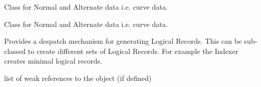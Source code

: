 \documentclass[letterpaper,10pt,english]{sphinxmanual}
\begin{document}

\begin{fulllineitems}
\label{\detokenize{ref/LIS/core/LogiRec:TotalDepth.LIS.core.LogiRec.LrNormalAlternateData}}
Class for Normal and Alternate data i.e. curve data.

\end{fulllineitems}


\begin{fulllineitems}
\label{\detokenize{ref/LIS/core/LogiRec:TotalDepth.LIS.core.LogiRec.LrNormalAlternateDataRead}}
Class for Normal and Alternate data i.e. curve data.

\end{fulllineitems}


\begin{fulllineitems}
\label{\detokenize{ref/LIS/core/LogiRec:TotalDepth.LIS.core.LogiRec.LrFactory}}
Provides a despatch mechanism for generating Logical Records.
This can be sub-classed to create different sets of Logical Records.
For example the Indexer creates minimal logical records.

\begin{fulllineitems}
\label{\detokenize{ref/LIS/core/LogiRec:TotalDepth.LIS.core.LogiRec.LrFactory.__weakref__}}
list of weak references to the object (if defined)

\end{fulllineitems}


\end{fulllineitems}

\end{document}
